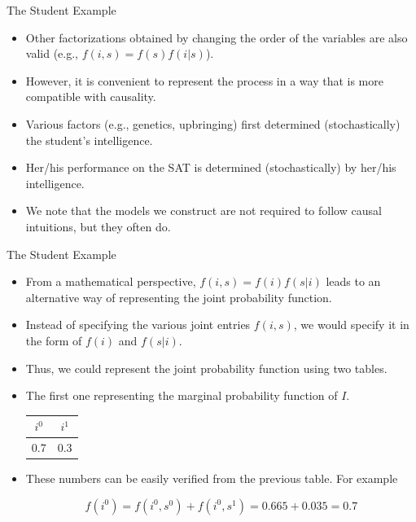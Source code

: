 \documentclass[handout]{beamer}
\begin{document}
\begin{frame}{The Student Example}
\scriptsize{
\begin{itemize}

\item Other factorizations obtained by changing the order of the variables are also valid (e.g., $f(i,s) = f(s)f(i|s)$).


\item However, it is convenient to represent the process in a way that is more compatible with causality.

\item Various factors (e.g., genetics, upbringing) first determined (stochastically) the student's intelligence.
\item Her/his performance on the SAT is determined (stochastically) by her/his  intelligence. 
\item We note that the models we construct are not required to follow causal intuitions, but they often do.



\end{itemize}



} 

\end{frame}


\begin{frame}{The Student Example}
\scriptsize{
\begin{itemize}

\item From a mathematical perspective, $ f(i,s) = f(i)f(s|i)$ leads to an alternative way of representing the joint probability function. 

\item Instead of specifying the various joint entries $f(i,s)$, we would specify it in the form of $f(i)$ and $f(s|i)$. 
\item Thus, we could represent the joint probability function using two tables.

\item The first one representing the marginal probability function of $I$.


\begin{table}
\centering
  \begin{tabular}{cc} \hline
$i^0$ & $i^1$  \\ \hline
0.7 & 0.3   
\end{tabular} 
\end{table}

\item These numbers can be easily verified from the previous table. For example 

\begin{displaymath}
f(i^{0})=f(i^{0},s^0)+f(i^{0},s^1)=0.665+0.035=0.7 
\end{displaymath}




\end{itemize}



} 

\end{frame}
\end{document}
